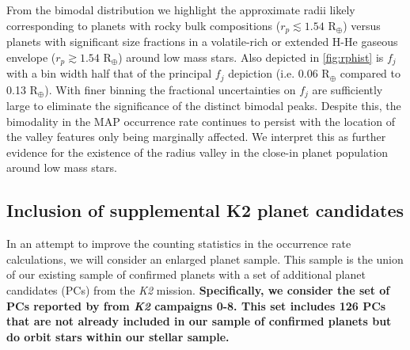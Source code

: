 \documentclass[twocolumn]{emulateapj}
\newcommand{\ktwo}[1]{\emph{K2}#1}
\begin{document}
From the bimodal distribution we highlight the approximate radii likely corresponding to planets with rocky
bulk compositions ($r_p\lesssim 1.54$ R$_{\oplus}$) versus planets with significant size fractions in a volatile-rich
or extended H-He gaseous
envelope ($r_p\gtrsim 1.54$ R$_{\oplus}$) around
low mass stars. Also depicted in \autoref{fig:rphist} is $f_j$ with a bin width half that of the principal
$f_j$ depiction (i.e. 0.06 R$_{\oplus}$ compared to 0.13 R$_{\oplus}$).
With finer binning the fractional uncertainties on $f_j$ are sufficiently
large to eliminate the significance of the distinct bimodal peaks. Despite this, the bimodality in the MAP
occurrence rate continues to persist with the location of the valley features only being marginally affected.
We interpret this as further evidence for the existence of the radius valley in the close-in planet population
around low mass stars.

\vspace{1cm}

\subsection{Inclusion of supplemental K2 planet candidates}
In an attempt to improve the counting statistics in the occurrence rate calculations,
we will consider an enlarged planet sample. This sample is the union of our existing sample of confirmed planets
with a set of additional planet candidates (PCs) from the \ktwo{}
mission. \textbf{Specifically, we consider the set of PCs reported by \cite{kruse19}
from \ktwo{} campaigns 0-8. This set includes 126 PCs that are not already included in our sample of confirmed
planets but do orbit stars within our stellar sample.}
\end{document}
